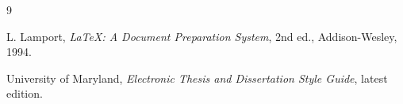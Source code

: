 \vspace*{-1in}

\begin{thebibliography}{9}
\vspace{-.25in}

\setlength{\parskip}{1em}

L. Lamport, \emph{LaTeX: A Document Preparation System}, 2nd ed.,
Addison-Wesley, 1994.

University of Maryland, \emph{Electronic Thesis and Dissertation Style Guide},
latest edition.

\end{thebibliography}
